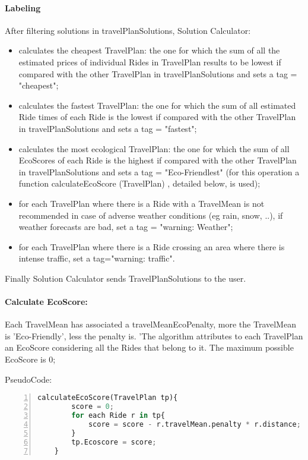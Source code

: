 	\paragraph{Labeling}
		\mbox{}\newline 
		After filtering solutions in travelPlanSolutions, Solution Calculator:\newline
	\begin{itemize}

		
	
		\item calculates the cheapest  TravelPlan: the one for which the sum of all the estimated prices of individual Rides in TravelPlan results to be lowest if compared with the other TravelPlan in travelPlanSolutions  and sets a tag = "cheapest";
	
		\item calculates the fastest TravelPlan: the one for which the sum of all estimated Ride times of each Ride is the lowest if compared with the other TravelPlan in travelPlanSolutions and sets a tag = "fastest"; 
		
		\item calculates the most ecological TravelPlan: the one for which  the sum of all EcoScores of each Ride is  the highest if compared with the other TravelPlan in travelPlanSolutions and sets a tag = "Eco-Friendlest" (for this operation a function calculateEcoScore (TravelPlan) , detailed below, is used);
	
		\item for each TravelPlan where there is a Ride with a TravelMean is not recommended in case of adverse weather conditions (eg rain, snow, ..), if weather forecasts are bad, set a tag = "warning: Weather";\newline
	
		\item for each TravelPlan where there is a Ride crossing an area where there is intense traffic, set a tag="warning: traffic". 
		\end{itemize}
	
		Finally Solution Calculator sends TravelPlanSolutions to the user.\newline
	
	\filbreak
	\paragraph{Calculate EcoScore:}	
	\mbox{} \newline
		Each TravelMean has associated a travelMeanEcoPenalty, more the TravelMean is 'Eco-Friendly', less the penalty is. 'The algorithm attributes to each TravelPlan an EcoScore considering all the Rides that belong to it.
		The maximum possible EcoScore is 0; \newline
	
	PseudoCode: \newline
	\begin{lstlisting}[language=python, numbers=left]
	calculateEcoScore(TravelPlan tp){
		score = 0;
		for each Ride r in tp{
			score = score - r.travelMean.penalty * r.distance;
		}
		tp.Ecoscore = score;
	}
	\end{lstlisting}